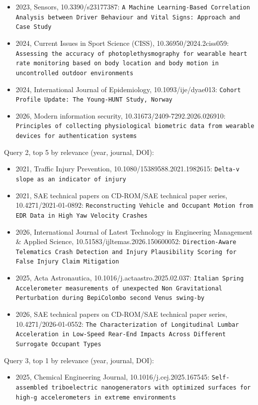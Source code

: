 \begin{itemize}
\item 2023, Sensors, 10.3390/s23177387: \texttt{A Machine Learning-Based Correlation Analysis between Driver Behaviour and Vital Signs: Approach and Case Study}
\item 2024, Current Issues in Sport Science (CISS), 10.36950/2024.2ciss059: \texttt{Assessing the accuracy of photoplethysmography for wearable heart rate monitoring based on body location and body motion in uncontrolled outdoor environments}
\item 2024, International Journal of Epidemiology, 10.1093/ije/dyae013: \texttt{Cohort Profile Update: The Young-HUNT Study, Norway}
\item 2026, Modern information security, 10.31673/2409-7292.2026.026910: \texttt{Principles of collecting physiological biometric data from wearable devices for authentication systems}
\end{itemize}

Query 2, top 5 by relevance (year, journal, DOI):

\begin{itemize}
\item 2021, Traffic Injury Prevention, 10.1080/15389588.2021.1982615: \texttt{Delta-v slope as an indicator of injury}
\item 2021, SAE technical papers on CD-ROM/SAE technical paper series, 10.4271/2021-01-0892: \texttt{Reconstructing Vehicle and Occupant Motion from EDR Data in High Yaw Velocity Crashes}
\item 2026, International Journal of Latest Technology in Engineering Management \& Applied Science, 10.51583/ijltemas.2026.150600052: \texttt{Direction-Aware Telematics Crash Detection and Injury Plausibility Scoring for False Injury Claim Mitigation}
\item 2025, Acta Astronautica, 10.1016/j.actaastro.2025.02.037: \texttt{Italian Spring Accelerometer measurements of unexpected Non Gravitational Perturbation during BepiColombo second Venus swing-by}
\item 2026, SAE technical papers on CD-ROM/SAE technical paper series, 10.4271/2026-01-0552: \texttt{The Characterization of Longitudinal Lumbar Acceleration in Low-Speed Rear-End Impacts Across Different Surrogate Occupant Types}
\end{itemize}

Query 3, top 1 by relevance (year, journal, DOI):

\begin{itemize}
\item 2025, Chemical Engineering Journal, 10.1016/j.cej.2025.167545: \texttt{Self-assembled triboelectric nanogenerators with optimized surfaces for high-g accelerometers in extreme environments}
\end{itemize}

